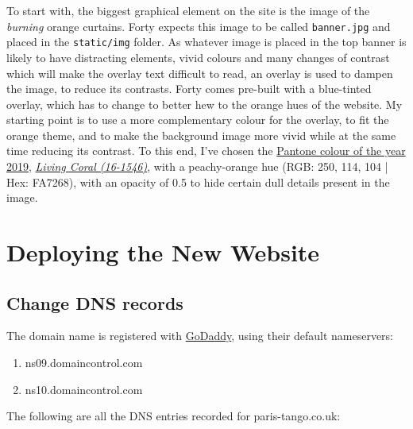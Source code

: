 \documentclass{article}
\begin{document}
To start with, the biggest graphical element on the site is the image of the
\emph{burning} orange curtains. Forty expects this image to be called \texttt{banner.jpg}
and placed in the \texttt{static/img} folder. As whatever image is placed in the top
banner is likely to have distracting elements, vivid colours and many changes of
contrast which will make the overlay text difficult to read, an overlay is used
to dampen the image, to reduce its contrasts. Forty comes pre-built with a
blue-tinted overlay, which has to change to better hew to the orange hues of the
website. My starting point is to use a more complementary colour for the
overlay, to fit the orange theme, and to make the background image more vivid
while at the same time reducing its contrast. To this end, I've chosen the
\href{https://www.pantone.com/color-intelligence/color-of-the-year/color-of-the-year-2019}{Pantone colour of the year 2019}, \emph{\href{https://www.pantone.com/color-finder/16-1546-TPX}{Living Coral (16-1546)}}, with a peachy-orange
hue (RGB: 250, 114, 104 | Hex: FA7268), with an opacity of 0.5 to hide certain
dull details present in the image.

\section{Deploying the New Website}
\label{sec:org43c8dd5}
\subsection{Change DNS records}
\label{sec:org6e341e4}
The domain name is registered with \href{https://godaddy.com/}{GoDaddy}, using their default nameservers:

\begin{enumerate}
\item ns09.domaincontrol.com
\item ns10.domaincontrol.com
\end{enumerate}

The following are all the DNS entries recorded for paris-tango.co.uk:
\end{document}
